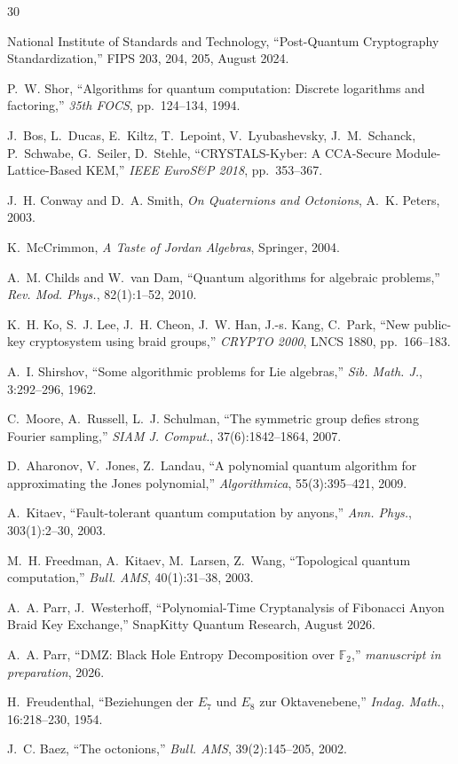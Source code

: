 \documentclass[11pt,letterpaper]{article}
\theoremstyle{definition}
\begin{document}
\begin{thebibliography}{30}

National Institute of Standards and Technology,
``Post-Quantum Cryptography Standardization,''
FIPS 203, 204, 205, August 2024.

P.~W. Shor,
``Algorithms for quantum computation: Discrete logarithms and factoring,''
\emph{35th FOCS}, pp.~124--134, 1994.

J.~Bos, L.~Ducas, E.~Kiltz, T.~Lepoint, V.~Lyubashevsky, J.~M.~Schanck,
P.~Schwabe, G.~Seiler, D.~Stehle,
``CRYSTALS-Kyber: A CCA-Secure Module-Lattice-Based KEM,''
\emph{IEEE EuroS\&P 2018}, pp.~353--367.

J.~H. Conway and D.~A. Smith,
\emph{On Quaternions and Octonions}, A.~K. Peters, 2003.

K.~McCrimmon,
\emph{A Taste of Jordan Algebras}, Springer, 2004.

A.~M. Childs and W.~van Dam,
``Quantum algorithms for algebraic problems,''
\emph{Rev. Mod. Phys.}, 82(1):1--52, 2010.

K.~H. Ko, S.~J. Lee, J.~H. Cheon, J.~W. Han, J.-s. Kang, C.~Park,
``New public-key cryptosystem using braid groups,''
\emph{CRYPTO 2000}, LNCS 1880, pp.~166--183.

A.~I. Shirshov,
``Some algorithmic problems for Lie algebras,''
\emph{Sib. Math. J.}, 3:292--296, 1962.

C.~Moore, A.~Russell, L.~J. Schulman,
``The symmetric group defies strong Fourier sampling,''
\emph{SIAM J. Comput.}, 37(6):1842--1864, 2007.

D.~Aharonov, V.~Jones, Z.~Landau,
``A polynomial quantum algorithm for approximating the Jones polynomial,''
\emph{Algorithmica}, 55(3):395--421, 2009.

A.~Kitaev,
``Fault-tolerant quantum computation by anyons,''
\emph{Ann. Phys.}, 303(1):2--30, 2003.

M.~H. Freedman, A.~Kitaev, M.~Larsen, Z.~Wang,
``Topological quantum computation,''
\emph{Bull. AMS}, 40(1):31--38, 2003.

A.~A. Parr, J.~Westerhoff,
``Polynomial-Time Cryptanalysis of Fibonacci Anyon Braid Key Exchange,''
SnapKitty Quantum Research, August 2026.

A.~A. Parr,
``DMZ: Black Hole Entropy Decomposition over $\mathbb{F}_2$,''
\textit{manuscript in preparation}, 2026.

H.~Freudenthal,
``Beziehungen der $E_7$ und $E_8$ zur Oktavenebene,''
\emph{Indag. Math.}, 16:218--230, 1954.

J.~C. Baez,
``The octonions,''
\emph{Bull. AMS}, 39(2):145--205, 2002.

\end{thebibliography}
\end{document}
